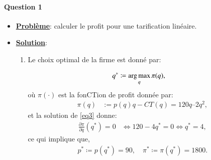     \begin{frame}
[allowframebreaks]{\insertsection}
\framesubtitle{Question 1\\}
\begin{itemize}
\item \textbf{\underline{Problème}}: calculer le profit pour une tarification linéaire.
 
\item \textbf{\underline{Solution}}:

\begin{enumerate}[$\cdot$]
\item Le choix optimal de la firme est donné par:

\begin{align}
q^* &\coloneqq \argmax_q \pi(q),
\label{eq3}
\end{align}
où  $\pi(\cdot)$ est la fonCTion de profit donnée par:
\begin{align*}
\pi(q) &:= p(q)q - CT(q) = 120q – 2q^2,
\end{align*}
et la solution de \eqref{eq3}  donne:
\begin{align*}
\frac{\partial \pi}{\partial q}(q^*) = 0 &\Leftrightarrow 120-4q^* = 0 \Leftrightarrow q^* = 4,
\end{align*}
ce qui implique que,
\begin{align*}
p^* \coloneqq p(q^*) = 90, \quad \pi^* \coloneqq \pi(q^*) = 1800.
\end{align*}

\end{enumerate}
\end{itemize}

 \end{frame}

